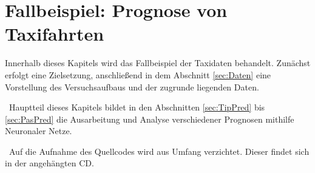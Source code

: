 \chapter{Fallbeispiel: Prognose von Taxifahrten}
\label{cha:Taxis} \label{cha:Experiment}
Innerhalb dieses Kapitels wird das Fallbeispiel der Taxidaten behandelt. Zunächst erfolgt eine Zielsetzung, anschließend in dem Abschnitt \ref{sec:Daten} eine Vorstellung des Versuchsaufbaus und der zugrunde liegenden Daten.

~\newline Hauptteil dieses Kapitels bildet in den Abschnitten \ref{sec:TipPred} bis \ref{sec:PasPred} die Ausarbeitung und Analyse verschiedener Prognosen mithilfe Neuronaler Netze.

~\newline Auf die Aufnahme des Quellcodes wird aus Umfang verzichtet. Dieser findet sich in der angehängten CD.




